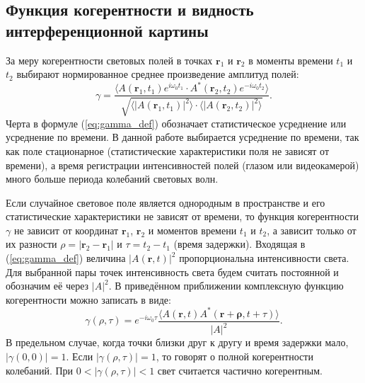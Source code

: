 \documentclass[a4paper,12pt]{extarticle}
\begin{document}
\subsection*{Функция когерентности и видность интерференционной картины}

За меру когерентности световых полей в точках $\mathbf{r}_1$ и $\mathbf{r}_2$ в моменты времени $t_1$ и $t_2$ выбирают нормированное среднее произведение амплитуд полей:
\begin{equation}
\gamma = \frac{\langle A(\mathbf{r}_1,t_1)e^{i\omega_0 t_1} \cdot A^*(\mathbf{r}_2,t_2)e^{-i\omega_0 t_2} \rangle}{\sqrt{\langle|A(\mathbf{r}_1,t_1)|^2\rangle \cdot \langle|A(\mathbf{r}_2,t_2)|^2\rangle}}.
\label{eq:gamma_def}
\end{equation}
Черта в формуле (\ref{eq:gamma_def}) обозначает статистическое усреднение или усреднение по времени. В данной работе выбирается усреднение по времени, так как поле стационарное (статистические характеристики поля не зависят от времени), а время регистрации интенсивностей полей (глазом или видеокамерой) много больше периода колебаний световых волн.

Если случайное световое поле является однородным в пространстве и его статистические характеристики не зависят от времени, то функция когерентности $\gamma$ не зависит от координат $\mathbf{r}_1$, $\mathbf{r}_2$ и моментов времени $t_1$ и $t_2$, а зависит только от их разности $\rho = |\mathbf{r}_2 - \mathbf{r}_1|$ и $\tau = t_2 - t_1$ (время задержки). Входящая в (\ref{eq:gamma_def}) величина $|A(\mathbf{r}, t)|^2$ пропорциональна интенсивности света. Для выбранной пары точек интенсивность света будем считать постоянной и обозначим её через $|A|^2$. В приведённом приближении комплексную функцию когерентности можно записать в виде:
\begin{equation}
\gamma(\rho,\tau)= e^{-i\omega_0\tau} \frac{\langle A(\mathbf{r},t)A^*(\mathbf{r}+\mathbf{\rho},t+\tau) \rangle}{|A|^2}.
\label{eq:gamma_simplified}
\end{equation}
В предельном случае, когда точки близки друг к другу и время задержки мало, $|\gamma(0,0)| = 1$. Если $|\gamma(\rho,\tau)| = 1$, то говорят о полной когерентности колебаний. При $0 < |\gamma(\rho,\tau)| < 1$ свет считается частично когерентным.
\end{document}
